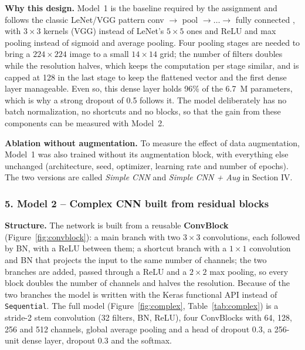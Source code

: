 \documentclass[12pt,letterpaper]{article}
\begin{document}
\textbf{Why this design.} Model~1 is the baseline required by the assignment and follows the classic LeNet/VGG pattern
conv $\rightarrow$ pool $\rightarrow\dots\rightarrow$ fully connected \cite{lecun1998,simonyan2015}, with $3\times3$
kernels (VGG) instead of LeNet's $5\times5$ ones and ReLU and max pooling instead of sigmoid and average pooling. Four
pooling stages are needed to bring a $224\times224$ image to a small $14\times14$ grid; the number of filters doubles
while the resolution halves, which keeps the computation per stage similar, and is capped at 128 in the last stage to
keep the flattened vector and the first dense layer manageable. Even so, this dense layer holds 96\% of the 6.7~M
parameters, which is why a strong dropout of 0.5 follows it. The model deliberately has no batch normalization, no
shortcuts and no blocks, so that the gain from these components can be measured with Model~2.

\textbf{Ablation without augmentation.} To measure the effect of data augmentation, Model~1 was also trained without
its augmentation block, with everything else unchanged (architecture, seed, optimizer, learning rate and number of
epochs). The two versions are called \emph{Simple CNN} and \emph{Simple CNN + Aug} in Section IV.

\subsubsection{5. Model 2 -- Complex CNN built from residual blocks}
\textbf{Structure.} The network is built from a reusable \textbf{ConvBlock} (Figure~\ref{fig:convblock}): a main
branch with two $3\times3$ convolutions, each followed by BN, with a ReLU between them; a shortcut branch with a
$1\times1$ convolution and BN that projects the input to the same number of channels; the two branches are added,
passed through a ReLU and a $2\times2$ max pooling, so every block doubles the number of channels and halves the
resolution. Because of the two branches the model is written with the Keras functional API instead of
\texttt{Sequential}. The full model (Figure~\ref{fig:complex}, Table~\ref{tab:complex}) is a stride-2 stem
convolution (32 filters, BN, ReLU), four ConvBlocks with 64, 128, 256 and 512 channels, global average pooling and a
head of dropout 0.3, a 256-unit dense layer, dropout 0.3 and the softmax.
\end{document}
